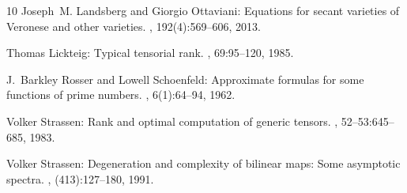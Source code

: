 \documentclass[11pt]{article}
\begin{document}
\begin{thebibliography}{10}
{\sc Joseph~M. Landsberg and Giorgio Ottaviani}: Equations for secant varieties
  of {V}eronese and other varieties.
, 192(4):569--606, 2013.
\newblock [\epfmtdoi{10.1007/s10231-011-0238-6}]

{\sc Thomas Lickteig}: Typical tensorial rank.
, 69:95--120, 1985.
\newblock [\epfmtdoi{10.1016/0024-3795(85)90070-9}]

{\sc J.~Barkley Rosser and Lowell Schoenfeld}: Approximate formulas for some
  functions of prime numbers.
, 6(1):64--94, 1962.

{\sc Volker Strassen}: Rank and optimal computation of generic tensors.
, 52--53:645--685, 1983.
\newblock [\epfmtdoi{10.1016/0024-3795(83)80041-X}]

{\sc Volker Strassen}: Degeneration and complexity of bilinear maps: {S}ome
  asymptotic spectra.
, (413):127--180, 1991.

\end{thebibliography}
\end{document}
